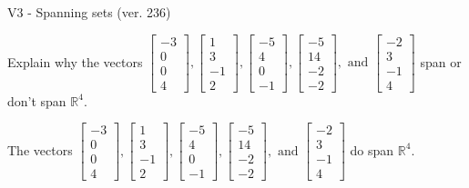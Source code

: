 \begin{exercise}
  \begin{exerciseTitle}V3 - Spanning sets (ver. 236)\end{exerciseTitle}
  \begin{exerciseStatement}
    Explain why the vectors \(\left[\begin{array}{r}
-3 \\
0 \\
0 \\
4
\end{array}\right] , \left[\begin{array}{r}
1 \\
3 \\
-1 \\
2
\end{array}\right] , \left[\begin{array}{r}
-5 \\
4 \\
0 \\
-1
\end{array}\right] , \left[\begin{array}{r}
-5 \\
14 \\
-2 \\
-2
\end{array}\right] , \text{ and } \left[\begin{array}{r}
-2 \\
3 \\
-1 \\
4
\end{array}\right]\) span or don't span \(\mathbb{R}^4\). 
	


  \end{exerciseStatement}
  \begin{exerciseAnswer}
   The vectors \(\left[\begin{array}{r}
-3 \\
0 \\
0 \\
4
\end{array}\right] , \left[\begin{array}{r}
1 \\
3 \\
-1 \\
2
\end{array}\right] , \left[\begin{array}{r}
-5 \\
4 \\
0 \\
-1
\end{array}\right] , \left[\begin{array}{r}
-5 \\
14 \\
-2 \\
-2
\end{array}\right] , \text{ and } \left[\begin{array}{r}
-2 \\
3 \\
-1 \\
4
\end{array}\right]\) 
  	 do  
	span \(\mathbb{R}^4\).
  



\end{exerciseAnswer}
\end{exercise}
